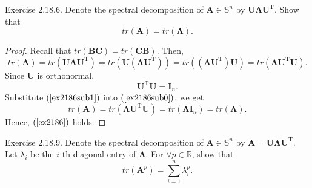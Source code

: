 \documentclass{article}
\theoremstyle{plain}
\begin{document}
\begin{itembox}[l]{Exercise 2.18.6.}
	Denote the spectral decomposition of $\bm{A} \in \mathbb{S}^n$ by $\bm{U} \bm{\Lambda} \bm{U}^{\mathrm{T}}$.
	Show that
	\begin{equation}
		\label{ex2186}
		tr(\bm{A}) = tr(\bm{\Lambda}) .
	\end{equation}
\end{itembox}


\begin{proof}
	Recall that $tr(\bm{B} \bm{C}) = tr(\bm{C} \bm{B})$. Then,
	\begin{equation}
		\label{ex2186sub0}
		tr(\bm{A}) = tr(\bm{U} \bm{\Lambda} \bm{U}^{\mathrm{T}}) = tr(\bm{U} (\bm{\Lambda} \bm{U}^{\mathrm{T}}))
		= tr((\bm{\Lambda} \bm{U}^{\mathrm{T}}) \bm{U}) = tr(\bm{\Lambda} \bm{U}^{\mathrm{T}} \bm{U}) .
	\end{equation}
	Since $\bm{U}$ is orthonormal,
	\begin{equation}
		\label{ex2186sub1}
		\bm{U}^{\mathrm{T}} \bm{U} = \bm{I}_n .
	\end{equation}
	Substitute $(\ref{ex2186sub1})$ into $(\ref{ex2186sub0})$, we get
	\begin{equation*}
		tr(\bm{A}) = tr(\bm{\Lambda} \bm{U}^{\mathrm{T}} \bm{U})
		= tr(\bm{\Lambda} \bm{I}_n) =  tr(\bm{\Lambda}) .
	\end{equation*}
	Hence, $(\ref{ex2186})$ holds.
\end{proof}


\begin{itembox}[l]{Exercise 2.18.9.}
	Denote the spectral decomposition of $\bm{A} \in \mathbb{S}^n$ by $\bm{A} = \bm{U} \bm{\Lambda} \bm{U}^{\mathrm{T}}$.
	Let $\lambda_i$ be the $i$-th diagonal entry of $\bm{\Lambda}$. For $\forall p \in \mathbb{R}$, show that
	\begin{equation}
		\label{ex2189}
		tr(\bm{A}^p) = \sum_{i=1}^n \lambda_i^p .
	\end{equation}
\end{itembox}
\end{document}
